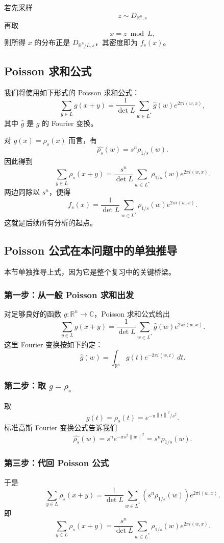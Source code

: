 \documentclass[12pt,a4paper]{ctexart}
\newcommand{\R}{\mathbb{R}}
\newcommand{\dual}{^{*}}
\newcommand{\ip}[2]{\left\langle #1,#2\right\rangle}
\newcommand{\norm}[1]{\left\lVert #1\right\rVert}
\begin{document}
若先采样
\[
z\sim D_{\R^n,s}
\]
再取
\[
x=z\bmod L,
\]
则所得 \(x\) 的分布正是 \(D_{\R^n/L,s}\)，其密度即为 \(f_s(x)\)。

\subsection{Poisson 求和公式}

我们将使用如下形式的 Poisson 求和公式：
\[
\sum_{y\in L} g(x+y)=\frac{1}{\det L}\sum_{w\in L\dual}\widehat{g}(w)e^{2\pi i\ip{w}{x}},
\]
其中 \(\widehat{g}\) 是 \(g\) 的 Fourier 变换。

对 \(g(x)=\rho_s(x)\) 而言，有
\[
\widehat{\rho_s}(w)=s^n \rho_{1/s}(w).
\]
因此得到
\[
\sum_{y\in L}\rho_s(x+y)
=
\frac{s^n}{\det L}\sum_{w\in L\dual}\rho_{1/s}(w)e^{2\pi i\ip{w}{x}}.
\]
两边同除以 \(s^n\)，便得
\[
f_s(x)
=
\frac{1}{\det L}\sum_{w\in L\dual}\rho_{1/s}(w)e^{2\pi i\ip{w}{x}}.
\]
这就是后续所有分析的起点。

\subsection{Poisson 公式在本问题中的单独推导}

本节单独推导上式，因为它是整个复习中的关键桥梁。

\subsubsection*{第一步：从一般 Poisson 求和出发}

对足够良好的函数 \(g:\R^n\to \mathbb{C}\)，Poisson 求和公式给出
\[
\sum_{y\in L} g(x+y)
=
\frac{1}{\det L}\sum_{w\in L\dual}\widehat{g}(w)e^{2\pi i\ip{w}{x}}.
\]
这里 Fourier 变换按如下约定：
\[
\widehat{g}(w)=\int_{\R^n} g(t)e^{-2\pi i\ip{w}{t}}\,dt.
\]

\subsubsection*{第二步：取 \(g=\rho_s\)}

取
\[
g(t)=\rho_s(t)=e^{-\pi \norm{t}^2/s^2}.
\]
标准高斯 Fourier 变换公式告诉我们
\[
\widehat{\rho_s}(w)=s^n e^{-\pi s^2 \norm{w}^2}=s^n \rho_{1/s}(w).
\]

\subsubsection*{第三步：代回 Poisson 公式}

于是
\[
\sum_{y\in L}\rho_s(x+y)
=
\frac{1}{\det L}
\sum_{w\in L\dual}
\left(s^n\rho_{1/s}(w)\right)e^{2\pi i\ip{w}{x}}.
\]
即
\[
\sum_{y\in L}\rho_s(x+y)
=
\frac{s^n}{\det L}\sum_{w\in L\dual}\rho_{1/s}(w)e^{2\pi i\ip{w}{x}}.
\]
\end{document}
